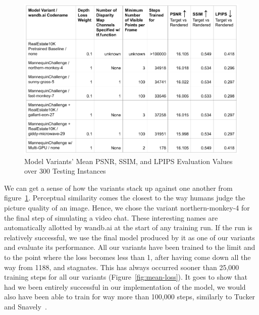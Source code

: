 \begin{figure}[!h]
    \includegraphics[width=1\columnwidth]{figures/model-variants-metrics.png}
    \caption{Model Variants' Mean PSNR, SSIM, and LPIPS Evaluation Values over 300 Testing Instances}
    \label{fig:model-variants-metrics}
\end{figure}

We can get a sense of how the variants stack up against one another from figure~\ref{fig:model-variants-metrics}. Perceptual similarity comes the closest to the way humans judge the picture quality of an image. Hence, we chose the variant northern-monkey-4 for the final step of simulating a video chat. These interesting names are automatically allotted by wandb.ai at the start of any training run. If the run is relatively successful, we use the final model produced by it as one of our variants and evaluate its performance. All our variants have been trained to the limit and to the point where the loss becomes less than 1, after having come down all the way from 1188, and stagnates. This has always occurred sooner than 25,000 training steps for all our variants (Figure~\ref{fig:mean-loss}). It goes to show that had we been entirely successful in our implementation of the model, we would also have been able to train for way more than 100,000 steps, similarly to Tucker and Snavely~\cite{single_view_mpi}. 

